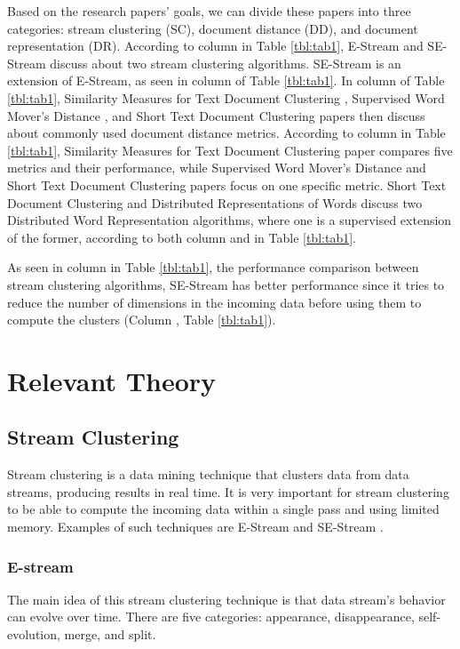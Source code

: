 \documentclass{IEEEtran}
\begin{document}
 Based on the research papers' goals, we can divide these papers into three categories: stream clustering (SC), document distance (DD), and document representation (DR). According to column  in Table \ref{tbl:tab1}, E-Stream \cite{EStream} and SE-Stream \cite{SEStream} discuss about two stream clustering algorithms. SE-Stream is an extension of E-Stream, as seen in column  of Table \ref{tbl:tab1}. In column  of Table \ref{tbl:tab1}, Similarity Measures for Text Document Clustering  \cite{SimMea}, Supervised Word Mover's Distance  \cite{WMD}, and Short Text Document Clustering \cite{SText} papers then discuss about commonly used document distance metrics. According to column  in Table \ref{tbl:tab1}, Similarity Measures for Text Document Clustering paper compares five metrics and their performance, while Supervised Word Mover's Distance and Short Text Document Clustering papers focus on one specific metric. Short Text Document Clustering and Distributed Representations of Words  \cite{Distributed} discuss two Distributed Word Representation algorithms, where one is a supervised extension of the former, according to both column  and  in Table \ref{tbl:tab1}. 

As seen  in column  in Table \ref{tbl:tab1}, the performance comparison between stream clustering algorithms, SE-Stream has better performance since it tries to reduce the number of dimensions in the incoming data before using them to compute the clusters (Column , Table \ref{tbl:tab1}).




\section{Relevant Theory}
\subsection{Stream Clustering}
Stream clustering is a data mining technique that clusters data from data streams, producing results in real time. It is very important for stream clustering to be able to compute the incoming data within a single pass and using limited memory.
Examples of such techniques are E-Stream \cite{EStream} and SE-Stream \cite{SEStream}.

\subsubsection{E-stream} 
The main idea of this stream clustering technique is that data stream's behavior can evolve over time. There are five categories: appearance, disappearance, self-evolution, merge, and split.
\end{document}
